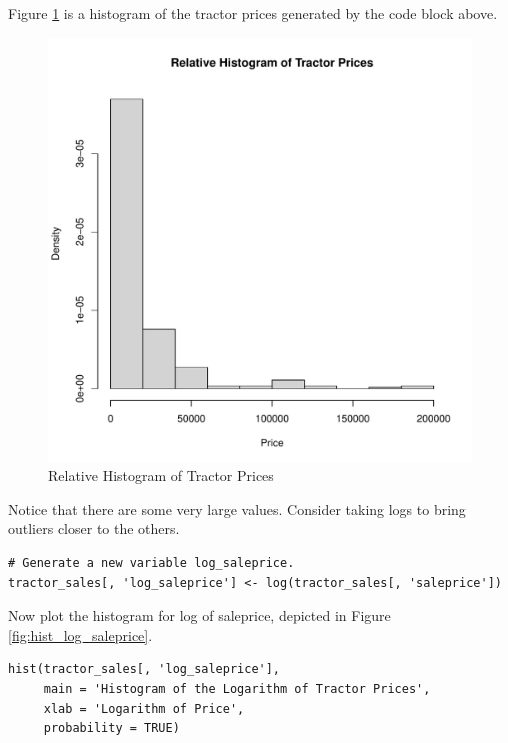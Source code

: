 Figure \ref{fig:hist_saleprice} is
a histogram of the tractor prices
generated by the code block above.
%
\begin{figure}[h!]
  \centering
  \includegraphics[scale = 0.5, keepaspectratio=true]{../Figures/hist_saleprice}
  \caption{Relative Histogram of Tractor Prices} \label{fig:hist_saleprice}
\end{figure}
%
%
Notice that there are some very large values.
Consider taking logs to bring outliers closer to the others.

\begin{verbatim}
# Generate a new variable log_saleprice.
tractor_sales[, 'log_saleprice'] <- log(tractor_sales[, 'saleprice'])
\end{verbatim}

Now plot the histogram for log of saleprice,
depicted in Figure \ref{fig:hist_log_saleprice}.

\begin{verbatim}
hist(tractor_sales[, 'log_saleprice'],
     main = 'Histogram of the Logarithm of Tractor Prices',
     xlab = 'Logarithm of Price',
     probability = TRUE)
\end{verbatim}


